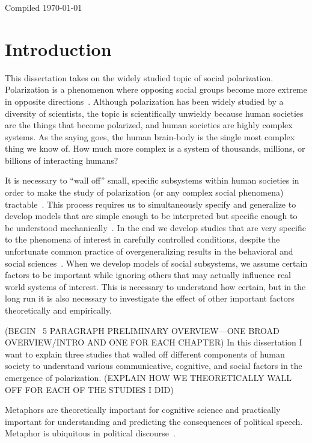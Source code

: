 \documentclass[12pt,letterpaper]{article}
\begin{document}
Compiled \today

\section{Introduction}

This dissertation takes on the widely studied topic of social polarization. 
Polarization is a phenomenon where opposing social groups become more extreme
in opposite directions~\cite{Baldassarri2007,Bramson2016,Bramson2017,Turner2018,Jung2019,Klein2020,StewartMcCBryson2020}. 
Although polarization has been widely studied by a diversity of scientists,
the topic is scientifically unwieldy because human societies are the things
that become polarized, and human societies are highly complex systems. As the
saying goes, the human brain-body is the single most complex thing we know of.
How much more complex is a system of thousands, millions, or billions of interacting 
humans?

It is necessary to ``wall off'' small, specific subsystems within human
societies in order to make the study of polarization (or any complex social
phenomena) tractable~\cite{Cartwright1999}.
This process requires us to simultaneously specify and generalize to 
develop models that
are simple enough to be interpreted but specific enough to be understood
mechanically~\cite{Craver2006,Wimsatt2007,Smaldino2017,Turner2021}. In the end
we develop studies that are very specific to the phenomena of interest
in carefully controlled conditions, despite the unfortunate common practice of
overgeneralizing results in the behavioral and social sciences~\cite{Yarkoni2021}.
When we develop models of social subsystems, we assume certain factors to be
important while ignoring others that may actually influence real world systems
of interest. This is necessary to understand how certain, but in the long run
it is also necessary to investigate the effect of other important factors
theoretically and empirically.

(BEGIN ~5 PARAGRAPH PRELIMINARY OVERVIEW---ONE BROAD OVERVIEW/INTRO AND 
ONE FOR EACH CHAPTER)
In this dissertation I want to explain three studies that walled off different
components of human society to understand various communicative, cognitive, and
social factors in the emergence of polarization. (EXPLAIN HOW WE THEORETICALLY
WALL OFF FOR EACH OF THE STUDIES I DID)

Metaphors are theoretically important for cognitive science and practically
important for understanding and predicting the consequences of political
speech. Metaphor is ubiquitous in political discourse~\cite{Burnes2011,Charteris-Black2009,Charteris-Black2005,Charteris-Black2004,Lakoff1996,Lakoff2008}.
\end{document}
